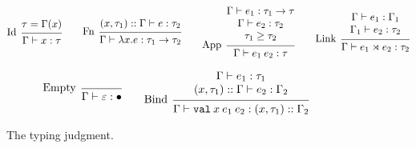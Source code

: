 \documentclass{article}
\theoremstyle{definition}
\newcommand*{\cons}{::}
\newcommand*{\link}[2]{{#1}\rtimes{#2}}
\newcommand*{\Lete}{\mathtt{val}}
\begin{document}
\begin{figure}[h!]
  \footnotesize
  \begin{flushright}
  \end{flushright}
  \centering
  \vspace{0pt} %
  \[
    \begin{prooftree}
      \hypo{\tau=\Gamma(x)}
      \infer[left label=Id]1{
      \Gamma\vdash x:\tau
      }
    \end{prooftree}\qquad
    \begin{prooftree}
      \hypo{(x,\tau_1)\cons\Gamma\vdash e:\tau_2}
      \infer[left label=Fn]1{
      \Gamma\vdash\lambda x.e:\tau_1\rightarrow\tau_2
      }
    \end{prooftree}\qquad
    \begin{prooftree}
      \hypo{
        \begin{matrix}
          \Gamma\vdash e_1:\tau_1\rightarrow\tau \\
          \Gamma\vdash e_2:\tau_2                \\
          \tau_1\ge\tau_2
        \end{matrix}
      }
      \infer[left label={App}]1{
      \Gamma\vdash e_{1}\:e_{2}:\tau
      }
    \end{prooftree}\qquad
    \begin{prooftree}
      \hypo{
        \begin{matrix}
          \Gamma\vdash e_1:\Gamma_1 \\
          \Gamma_1\vdash e_2:\tau_2
        \end{matrix}
      }
      \infer[left label=Link]1{
      \Gamma\vdash\link{e_{1}}{e_{2}}:\tau_2
      }
    \end{prooftree}
  \]

  \[
    \begin{prooftree}
      \infer[left label=Empty]0{
      \Gamma\vdash\varepsilon:\bullet
      }
    \end{prooftree}\qquad
    \begin{prooftree}
      \hypo{
        \begin{matrix}
          \Gamma\vdash e_1:\tau_1 \\
          (x, \tau_1)\cons\Gamma\vdash e_2:\Gamma_2
        \end{matrix}
      }
      \infer[left label=Bind]1{
      \Gamma\vdash\Lete\:x\:e_1\:e_2:(x,\tau_1)\cons\Gamma_2
      }
    \end{prooftree}
  \]
  \caption{The typing judgment.}
  \label{fig:exttypjudge}
\end{figure}
\end{document}
